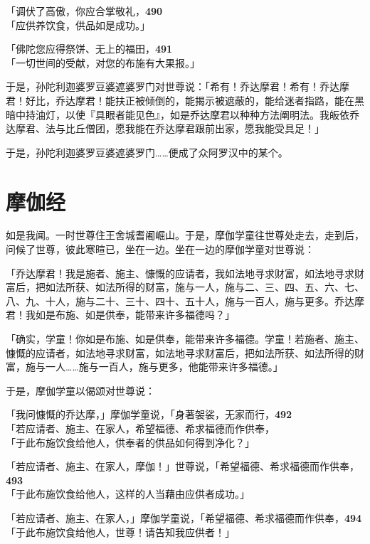 「调伏了高傲，你应合掌敬礼，\hfill{\grayfootnotesize \textbf{490}} \\
「应供养饮食，供品如是成功。」


「佛陀您应得祭饼、无上的福田，\hfill{\grayfootnotesize \textbf{491}} \\
「一切世间的受献，对您的布施有大果报。」


于是，孙陀利迦婆罗豆婆遮婆罗门对世尊说：「希有！乔达摩君！希有！乔达摩君！好比，乔达摩君！能扶正被倾倒的，能揭示被遮蔽的，能给迷者指路，能在黑暗中持油灯，以使『具眼者能见色』，如是乔达摩君以种种方法阐明法。我皈依乔达摩君、法与比丘僧团，愿我能在乔达摩君跟前出家，愿我能受具足！」

于是，孙陀利迦婆罗豆婆遮婆罗门……便成了众阿罗汉中的某个。

\section{摩伽经}

如是我闻。一时世尊住王舍城耆阇崛山。于是，摩伽学童往世尊处走去，走到后，问候了世尊，彼此寒暄已，坐在一边。坐在一边的摩伽学童对世尊说：


「乔达摩君！我是施者、施主、慷慨的应请者，我如法地寻求财富，如法地寻求财富后，把如法所获、如法所得的财富，施与一人，施与二、三、四、五、六、七、八、九、十人，施与二十、三十、四十、五十人，施与一百人，施与更多。乔达摩君！我如是布施、如是供奉，能带来许多福德吗？」


「确实，学童！你如是布施、如是供奉，能带来许多福德。学童！若施者、施主、慷慨的应请者，如法地寻求财富，如法地寻求财富后，把如法所获、如法所得的财富，施与一人……施与一百人，施与更多，他能带来许多福德。」


于是，摩伽学童以偈颂对世尊说：


「我问慷慨的乔达摩，」摩伽学童说，「身著袈裟，无家而行，\hfill{\grayfootnotesize \textbf{492}} \\
「若应请者、施主、在家人，希望福德、希求福德而作供奉，\\
「于此布施饮食给他人，供奉者的供品如何得到净化？」


「若应请者、施主、在家人，摩伽！」世尊说，「希望福德、希求福德而作供奉，\hfill{\grayfootnotesize \textbf{493}} \\
「于此布施饮食给他人，这样的人当藉由应供者成功。」


「若应请者、施主、在家人，」摩伽学童说，「希望福德、希求福德而作供奉，\hfill{\grayfootnotesize \textbf{494}} \\
「于此布施饮食给他人，世尊！请告知我应供者！」


